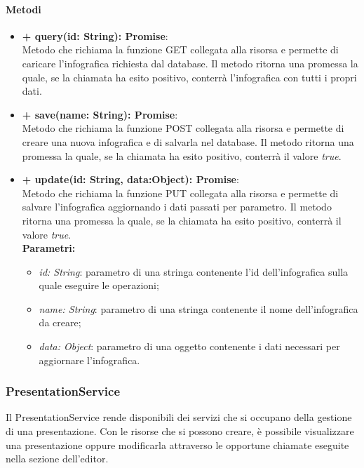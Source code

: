 		\paragraph{Metodi}
		\begin{itemize}
			\item \textbf{+ query(id: String): Promise}:\\
				Metodo che richiama la funzione GET collegata alla risorsa e permette di caricare l'infografica richiesta dal database. Il metodo ritorna una promessa la quale, se la chiamata ha esito positivo, conterrà l'infografica con tutti i propri dati.\\
			\item \textbf{+ save(name: String): Promise}:\\
				Metodo che richiama la funzione POST collegata alla risorsa e permette di creare una nuova infografica e di salvarla nel database. Il metodo ritorna una promessa la quale, se la chiamata ha esito positivo, conterrà il valore \textit{true}.\\
			\item \textbf{+ update(id: String, data:Object): Promise}:\\
				Metodo che richiama la funzione PUT collegata alla risorsa e permette di salvare l'infografica aggiornando i dati passati per parametro. Il metodo ritorna una promessa la quale, se la chiamata ha esito positivo, conterrà il valore \textit{true}.\\
			\textbf{Parametri:}\\
			\begin{itemize}
				\item \textit{id: String}: parametro di una stringa contenente l'id dell'infografica sulla quale eseguire le operazioni;
				\item \textit{name: String}: parametro di una stringa contenente il nome dell'infografica da creare;
				\item \textit{data: Object}: parametro di una oggetto contenente i dati necessari per aggiornare l'infografica.
			\end{itemize}
		\end{itemize}
\newpage


\subsubsection{PresentationService}
Il PresentationService rende disponibili dei servizi che si occupano della gestione di una presentazione. Con le risorse che si possono creare, è possibile visualizzare una presentazione oppure modificarla attraverso le opportune chiamate eseguite nella sezione dell'editor.



